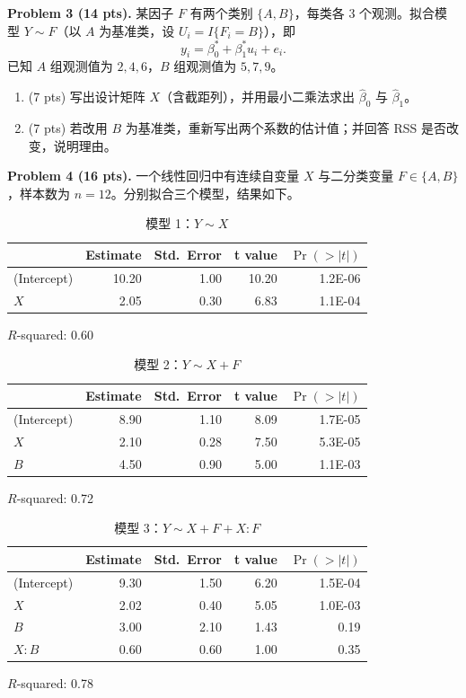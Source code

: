 \documentclass[11pt]{ctexart}
\begin{document}
\noindent\textbf{Problem 3 (14 pts).} 某因子 $F$ 有两个类别 $\{A, B\}$，每类各 $3$ 个观测。拟合模型 $Y \sim F$（以 $A$ 为基准类，设 $U_i = I\{F_i = B\}$），即
\[
y_i = \beta_0^* + \beta_1^* u_i + e_i.
\]
已知 $A$ 组观测值为 $2, 4, 6$，$B$ 组观测值为 $5, 7, 9$。
\begin{enumerate}
\item (7 pts) 写出设计矩阵 $X$（含截距列），并用最小二乘法求出 $\hat\beta_0$ 与 $\hat\beta_1$。
\item (7 pts) 若改用 $B$ 为基准类，重新写出两个系数的估计值；并回答 RSS 是否改变，说明理由。
\end{enumerate}

\noindent\textbf{Problem 4 (16 pts).} 一个线性回归中有连续自变量 $X$ 与二分类变量 $F \in \{A, B\}$，样本数为 $n = 12$。分别拟合三个模型，结果如下。

\begin{table}[h]
\centering
\caption{模型 1：$Y \sim X$}
\begin{tabular}{lrrrr}
\toprule
 & Estimate & Std.\ Error & t value & $\Pr(>|t|)$ \\
\midrule
(Intercept) & 10.20 & 1.00 & 10.20 & 1.2E-06 \\
$X$ & 2.05 & 0.30 & 6.83 & 1.1E-04 \\
\bottomrule
\end{tabular}

\vspace{0.3em}
\centering $R$-squared: 0.60
\end{table}

\begin{table}[h]
\centering
\caption{模型 2：$Y \sim X + F$}
\begin{tabular}{lrrrr}
\toprule
 & Estimate & Std.\ Error & t value & $\Pr(>|t|)$ \\
\midrule
(Intercept) & 8.90 & 1.10 & 8.09 & 1.7E-05 \\
$X$ & 2.10 & 0.28 & 7.50 & 5.3E-05 \\
$B$ & 4.50 & 0.90 & 5.00 & 1.1E-03 \\
\bottomrule
\end{tabular}

\vspace{0.3em}
\centering $R$-squared: 0.72
\end{table}

\begin{table}[h]
\centering
\caption{模型 3：$Y \sim X + F + X : F$}
\begin{tabular}{lrrrr}
\toprule
 & Estimate & Std.\ Error & t value & $\Pr(>|t|)$ \\
\midrule
(Intercept) & 9.30 & 1.50 & 6.20 & 1.5E-04 \\
$X$ & 2.02 & 0.40 & 5.05 & 1.0E-03 \\
$B$ & 3.00 & 2.10 & 1.43 & 0.19 \\
$X : B$ & 0.60 & 0.60 & 1.00 & 0.35 \\
\bottomrule
\end{tabular}

\vspace{0.3em}
\centering $R$-squared: 0.78
\end{table}
\end{document}
